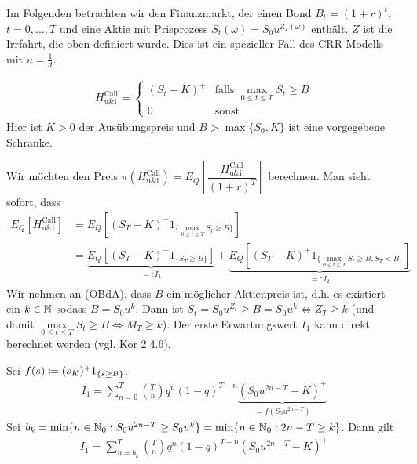 \documentclass[a4paper,twoside,DIV15,BCOR12mm]{scrbook}
\begin{document}
Im Folgenden betrachten wir den Finanzmarkt, der einen Bond $B_t=(1+r)^t$, $t=0,\ldots,T$ und eine Aktie mit Prisprozess $S_t(\omega)=S_0u^{Z_T(\omega)}$ enthält. $Z$ ist die Irrfahrt, die oben definiert wurde. Dies ist ein spezieller Fall des CRR-Modells mit $u=\frac {1}{d}$.
\begin{beispiel}
\begin{align*}
H_{\text{u\&i}}^{\text{Call}} = 
\begin{cases}
(S_t-K)^+ & \text{falls }\max_{0\le t\le T}S_t \ge B \\
0 & \text{sonst}
\end{cases}
\end{align*}
Hier ist $K>0$ der Ausübungspreis und $B> \max\{S_0,K\}$ ist eine vorgegebene Schranke.

Wir möchten den Preis $\pi(H_{\text{u\&i}}^{\text{Call}})=E_Q\left[\dfrac{H_{\text{u\&i}}^{\text{Call}}}{(1+r)^T}\right]$ berechnen. Man sieht sofort, dass
\begin{align*}
E_Q[H_{\text{u\&i}}^{\text{Call}}]&=E_Q[(S_T-K)^+ 1_{\{\max\limits_{0\le t\le T} S_t\ge B\}}]\\
&=\underbrace{E_Q[(S_T-K)^+1_{\{S_T\ge B\}}]}_{=:I_1}+\underbrace{E_Q[(S_T-K)^+ 1_{\{\max\limits_{0\le t\le T} S_t\ge B,S_T<B\}}]}_{=:I_2}
\end{align*}
Wir nehmen an (OBdA), dass $B$ ein möglicher Aktienpreis ist, d.h. es existiert ein $k\in\mathbb{N}$ sodass $B=S_0u^k$. Dann ist $S_t=S_0u^{Z_t} \ge B=S_0u^k\iff Z_T\ge k$ (und damit $\max\limits_{0\le t\le T} S_t \ge B \iff M_T\ge k$).
Der erste Erwartungswert $I_1$ kann direkt berechnet werden (vgl. Kor 2.4.6).

Sei $f(s)\da(s_K)^+1_{\{s\ge B\}}$.
\begin{align*}
I_1=\sum\limits_{n=0}^T {T\choose n} q^n (1-q)^{T-n} \underbrace{(S_0u^{2n-T}-K)^+}_{=f(S_0u^{2n-T})}
\end{align*}
Sei $b_k=\min\{n\in\mathbb{N}_0:S_0u^{2n-T}\ge S_0u^k\}=\min\{n\in\mathbb{N}_0:2n-T\ge k\}$. Dann gilt
\begin{align*}
I_1=\sum\limits_{n=b_k}^T {T\choose n} q^n (1-q)^{T-n} (S_0u^{2n-T}-K)^+
\end{align*}


\end{beispiel}
\end{document}
